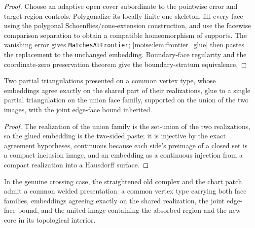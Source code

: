 \begin{proof}
\leanok
Choose an adaptive open cover subordinate to the pointwise error and target
region controls.  Polygonalize its locally finite one-skeleton, fill every
face using the polygonal Schoenflies/cone-extension construction, and use the
facewise comparison separation to obtain a compatible homeomorphism of
supports.  The vanishing error gives
\texttt{MatchesAtFrontier}; \ref{moise:lem:frontier_glue} then pastes the
replacement to the unchanged embedding.  Boundary-face regularity and the
coordinate-zero preservation theorem give the boundary-stratum equivalence.
\end{proof}

\begin{theorem}
\label{moise:thm:partial_glue}
\leanok
{}
Two partial triangulations presented on a common vertex type, whose embeddings
agree exactly on the shared part of their realizations, glue to a single
partial triangulation on the union face family, supported on the union of the
two images, with the joint edge-face bound inherited.
\end{theorem}

\begin{proof}
\leanok
The realization of the union family is the set-union of the two realizations,
so the glued embedding is the two-sided paste; it is injective by the exact
agreement hypotheses, continuous because each side's preimage of a closed set
is a compact inclusion image, and an embedding as a continuous injection from
a compact realization into a Hausdorff surface.
\end{proof}

\begin{theorem}
\label{moise:thm:crossing_weld}
\leanok
{}
In the genuine crossing case, the straightened old complex and the chart patch
admit a common welded presentation: a common vertex type carrying both face
families, embeddings agreeing exactly on the shared realization, the joint
edge-face bound, and the united image containing the absorbed region and the
new core in its topological interior.
\end{theorem}


